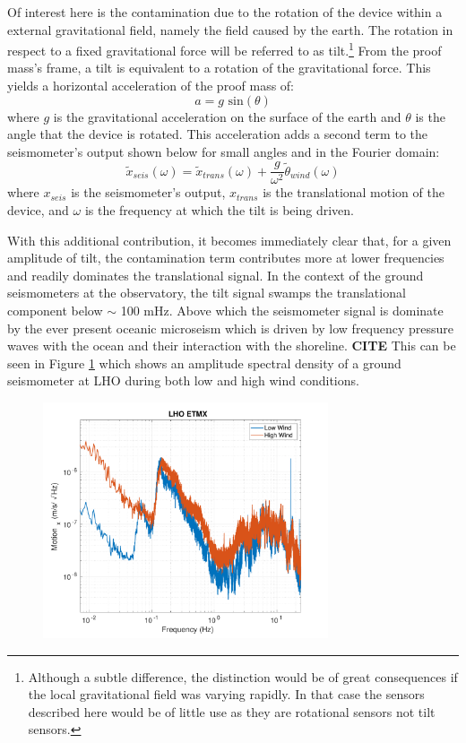 \documentclass [12pt, proquest]{uwthesis}[2019]
\begin{document}
Of interest here is the contamination due to the rotation of the device within a external gravitational field, namely the field caused by the earth. The rotation in respect to a fixed gravitational force will be referred to as tilt.\footnote{Although a subtle difference, the distinction would be of great consequences if the local gravitational field was varying rapidly. In that case the sensors described here would be of little use as they are rotational sensors not tilt sensors.} From the proof mass's frame, a tilt is equivalent to a rotation of the gravitational force. This yields a horizontal acceleration of the proof mass of:
\[ a=g \text{ sin}(\theta)\]
where $g$ is the gravitational acceleration on the surface of the earth and $\theta$ is the angle that the device is rotated. This acceleration adds a second term to the seismometer's output shown below for small angles and in the Fourier domain:
\[\tilde{x}_{seis}(\omega)=\tilde{x}_{trans}(\omega)+\frac{g}{\omega^2}\tilde{\theta}_{wind}(\omega)\]
where $x_{seis}$ is the seismometer's output, $x_{trans}$ is the translational motion of the device, and $\omega$ is the frequency at which the tilt is being driven. 

With this additional contribution, it becomes immediately clear that, for a given amplitude of tilt, the contamination term contributes more at lower frequencies and readily dominates the translational signal. In the context of the ground seismometers at the observatory, the tilt signal swamps the translational component below $\sim$ 100 mHz. Above which the seismometer signal is dominate by the ever present oceanic microseism which is driven by low frequency pressure waves with the ocean and their interaction with the shoreline. \textbf{CITE} This can be seen in Figure \ref{wind} which shows an amplitude spectral density of a ground seismometer at LHO during both low and high wind conditions.

\begin{figure}%
\begin{center}
\includegraphics[width=0.75\textwidth]{windComp.pdf}
\caption{}
\label{wind}
\end{center}
\end{figure}
\end{document}
